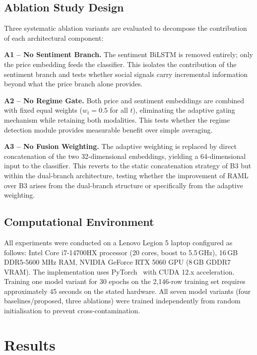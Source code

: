 \documentclass[journal]{IEEEtran}
\newcommand{\raml}{\textsc{RAML}}
\newcommand{\bilstm}{BiLSTM}
\begin{document}
\subsection{Ablation Study Design}
Three systematic ablation variants are evaluated to decompose the contribution
of each architectural component:

\textbf{A1 -- No Sentiment Branch.}
The sentiment \bilstm{} is removed entirely; only the price embedding feeds
the classifier. This isolates the contribution of the sentiment branch and
tests whether social signals carry incremental information beyond what the
price branch alone provides.

\textbf{A2 -- No Regime Gate.}
Both price and sentiment embeddings are combined with fixed equal weights
($w_t = 0.5$ for all $t$), eliminating the adaptive gating mechanism while
retaining both modalities. This tests whether the regime detection module
provides measurable benefit over simple averaging.

\textbf{A3 -- No Fusion Weighting.}
The adaptive weighting is replaced by direct concatenation of the two
32-dimensional embeddings, yielding a 64-dimensional input to the classifier.
This reverts to the static concatenation strategy of B3 but within the
dual-branch architecture, testing whether the improvement of \raml{} over
B3 arises from the dual-branch structure or specifically from the adaptive
weighting.

\subsection{Computational Environment}
All experiments were conducted on a Lenovo Legion 5 laptop configured as
follows: Intel Core i7-14700HX processor (20 cores, boost to 5.5\,GHz),
16\,GB DDR5-5600 MHz RAM, NVIDIA GeForce RTX 5060 GPU (8\,GB GDDR7 VRAM).
The implementation uses PyTorch~\cite{paszke2019pytorch} with CUDA 12.x
acceleration. Training one model variant for 30 epochs on the 2,146-row
training set requires approximately 45 seconds on the stated hardware.
All seven model variants (four baselines/proposed, three ablations) were
trained independently from random initialisation to prevent cross-contamination.

\section{Results}
\label{sec:results}
\end{document}
